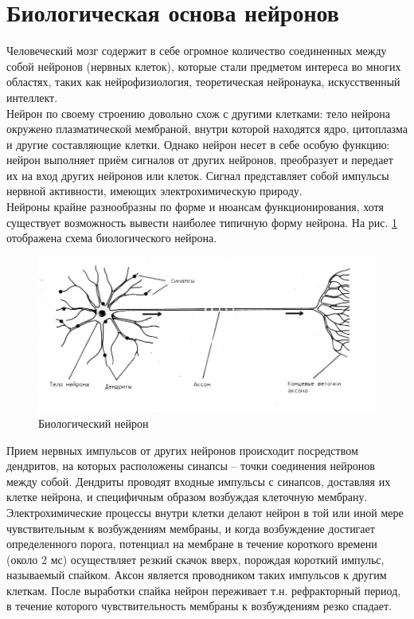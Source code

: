 \documentclass[a4paper,10pt]{article}
\begin{document}
\section{Биологическая основа нейронов}
\indent Человеческий мозг содержит в себе огромное количество соединенных между собой нейронов (нервных клеток), которые стали предметом интереса во многих областях, таких как нейрофизиология, теоретическая нейронаука, искусственный интеллект.\\
\indent Нейрон по своему строению довольно схож с другими клетками: тело нейрона окружено плазматической мембраной, внутри которой находятся ядро, цитоплазма и другие составляющие клетки. Однако нейрон несет в себе особую функцию: нейрон выполняет приём сигналов от других нейронов, преобразует и передает их на вход других нейронов или клеток. Сигнал представляет собой импульсы нервной активности, имеющих электрохимическую природу.\\
\indent Нейроны крайне разнообразны по форме и нюансам функционирования, хотя существует возможность вывести наиболее типичную форму нейрона. На рис. \ref{bio_pic} отображена схема биологического нейрона. \\
\begin{figure}[ht]
\centering
\includegraphics[width=1\linewidth]{bio_neuron.jpg}
\caption{Биологический нейрон}
\label{bio_pic}
\end{figure}
\indent Прием нервных импульсов от других нейронов происходит посредством дендритов, на которых расположены синапсы -- точки соединения нейронов между собой. Дендриты проводят входные импульсы с синапсов, доставляя их клетке нейрона, и специфичным образом возбуждая клеточную мембрану.\\
\indent Электрохимические процессы внутри клетки делают нейрон в той или иной мере чувствительным к возбуждениям мембраны, и когда возбуждение достигает определенного порога, потенциал на мембране в течение короткого времени (около 2 мс) осуществляет резкий скачок вверх, порождая короткий импульс, называемый спайком. Аксон является проводником таких импульсов к другим клеткам. После выработки спайка нейрон переживает т.н. рефракторный период, в течение которого чувствительность мембраны к возбуждениям резко спадает.\\
\end{document}
